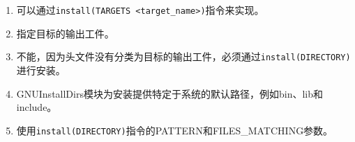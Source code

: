 

\begin{enumerate}
\item 
可以通过\texttt{install(TARGETS <target\_name>)}指令来实现。

\item
指定目标的输出工件。

\item 
不能，因为头文件没有分类为目标的输出工件，必须通过\texttt{install(DIRECTORY)}进行安装。

\item 
GNUInstallDirs模块为安装提供特定于系统的默认路径，例如bin、lib和include。

\item 
使用\texttt{install(DIRECTORY)}指令的PATTERN和FILES\_MATCHING参数。
\end{enumerate}